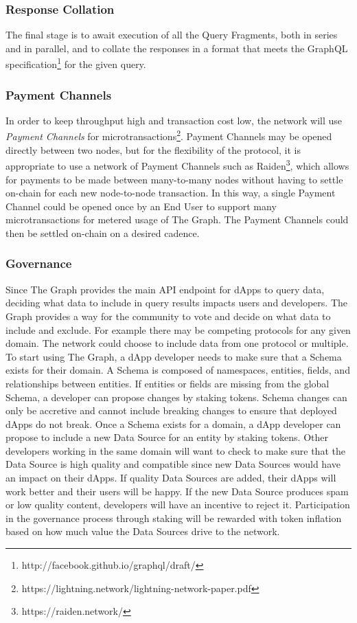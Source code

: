 \documentclass[12pt]{article}
\begin{document}
\subsubsection*{Response Collation}
The final stage is to await execution of all the Query Fragments, both in series and in parallel, and to collate the responses in a format that meets the GraphQL specification\footnote{http://facebook.github.io/graphql/draft/} for the given query.
\subsubsection*{Payment Channels}
In order to keep throughput high and transaction cost low, the network will use \textit{Payment Channels} for microtransactions\footnote{https://lightning.network/lightning-network-paper.pdf}. Payment Channels may be opened directly between two nodes, but for the flexibility of the protocol, it is appropriate to use a network of Payment Channels such as Raiden\footnote{https://raiden.network/}, which allows for payments to be made between many-to-many nodes without having to settle on-chain for each new node-to-node transaction. In this way, a single Payment Channel could be opened once by an End User to support many microtransactions for metered usage of The Graph. The Payment Channels could then be settled on-chain on a desired cadence.
\subsubsection*{Governance}
Since The Graph provides the main API endpoint for dApps to query data, deciding what data to include in query results impacts users and developers. The Graph provides a way for the community to vote and decide on what data to include and exclude. For example there may be competing protocols for any given domain. The network could choose to include data from one protocol or multiple.
\newline
\newline
To start using The Graph, a dApp developer needs to make sure that a Schema exists for their domain. A Schema is composed of namespaces, entities, fields, and relationships between entities. If entities or fields are missing from the global Schema, a developer can propose changes by staking tokens. Schema changes can only be accretive and cannot include breaking changes to ensure that deployed dApps do not break.
\newline
\newline
Once a Schema exists for a domain, a dApp developer can propose to include a new Data Source for an entity by staking tokens. Other developers working in the same domain will want to check to make sure that the Data Source is high quality and compatible since new Data Sources would have an impact on their dApps. If quality Data Sources are added, their dApps will work better and their users will be happy. If the new Data Source produces spam or low quality content, developers will have an incentive to reject it. Participation in the governance process through staking will be rewarded with token inflation based on how much value the Data Sources drive to the network.
\end{document}
